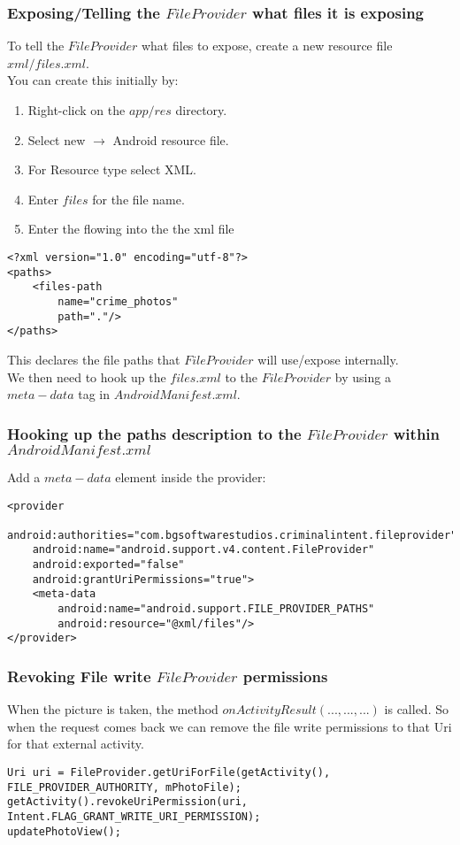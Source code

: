 \documentclass[]{article}
\begin{document}
\subsubsection{Exposing/Telling the $FileProvider$ what files it is exposing}
To tell the $FileProvider$ what files to expose, create a new resource file $xml/files.xml$.
\\
You can create this initially by:
\begin{enumerate}
	\item Right-click on the $app/res$ directory.
	\item Select new $\rightarrow$ Android resource file.
	\item For Resource type select XML.
	\item Enter $files$ for the file name.
	\item Enter the flowing into the the xml file
\end{enumerate}
\begin{lstlisting}
<?xml version="1.0" encoding="utf-8"?>
<paths>
	<files-path
		name="crime_photos"
		path="."/>
</paths>
\end{lstlisting}
This declares the file paths that $FileProvider$ will use/expose internally.
\\
We then need to hook up the $files.xml$ to the $FileProvider$ by using a $meta-data$ tag in $AndroidManifest.xml$.
\subsubsection{Hooking up the paths description to the $FileProvider$ within $AndroidManifest.xml$}
Add a $meta-data$ element inside the provider:
\begin{lstlisting}
<provider
	android:authorities="com.bgsoftwarestudios.criminalintent.fileprovider"
	android:name="android.support.v4.content.FileProvider"
	android:exported="false"
	android:grantUriPermissions="true">
	<meta-data
		android:name="android.support.FILE_PROVIDER_PATHS"
		android:resource="@xml/files"/>
</provider>
\end{lstlisting}

\subsubsection{Revoking File write $FileProvider$ permissions}
When the picture is taken, the method $onActivityResult(...,...,...)$ is called.  So when the request comes back we can remove the file write permissions to that Uri for that external activity.
\begin{lstlisting}
Uri uri = FileProvider.getUriForFile(getActivity(), FILE_PROVIDER_AUTHORITY, mPhotoFile);
getActivity().revokeUriPermission(uri, Intent.FLAG_GRANT_WRITE_URI_PERMISSION);
updatePhotoView();
\end{lstlisting}
\end{document}
